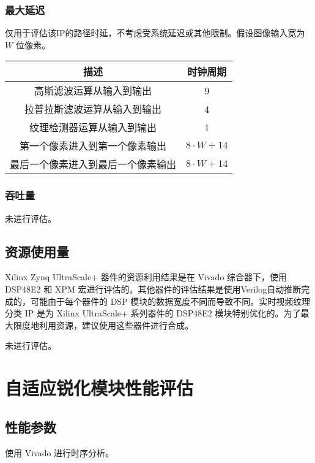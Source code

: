\documentclass[12pt, a4paper, oneside]{ctexbook}
\begin{document}
		\subsection{最大延迟}
		仅用于评估该IP的路径时延，不考虑受系统延迟或其他限制。假设图像输入宽为 $W$ 位像素。
		\begin{table}[h]
			\centering
			\begin{tabular}{|c|c|}
				\hline
				\textbf{描述}       & \textbf{时钟周期}   \\ \hline
				高斯滤波运算从输入到输出      & 9               \\ \hline
				拉普拉斯滤波运算从输入到输出    & 4               \\ \hline
				纹理检测器运算从输入到输出     & 1               \\ \hline
				第一个像素进入到第一个像素输出   & $8\cdot W+14$   \\ \hline
				最后一个像素进入到最后一个像素输出 & $8\cdot W + 14$ \\ \hline
			\end{tabular}
		\end{table}
		\subsection{吞吐量}
		未进行评估。
	\section{资源使用量}
	Xilinx Zynq UltraScale+ 器件的资源利用结果是在 Vivado 综合器下，使用 DSP48E2 和 XPM 宏进行评估的。其他器件的评估结果是使用Verilog自动推断完成的，可能由于每个器件的 DSP 模块的数据宽度不同而导致不同。实时视频纹理分类 IP 是为 Xilinx UltraScale+ 系列器件的 DSP48E2 模块特别优化的。为了最大限度地利用资源，建议使用这些器件进行合成。\par 未进行评估。
	
	
	\chapter{自适应锐化模块性能评估}
	\section{性能参数}
	使用 Vivado 进行时序分析。
\end{document}
